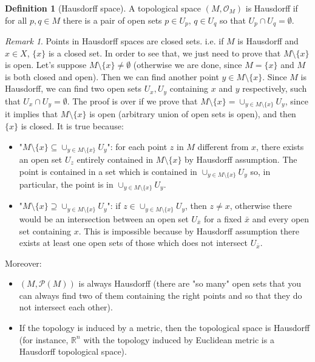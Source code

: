 \documentclass[a4paper,11pt,titlepage, article, oneside]{memoir}
\numberwithin{equation}{section}
\theoremstyle{definition}
\newtheorem{definition}[theorem]{Definition}
\theoremstyle{remark}
\newtheorem{remark}[theorem]{Remark}
\newcommand{\rfield}{\mathbb{R}}
\begin{document}
\begin{definition}[Hausdorff space]
A topological space $(M, \mathcal{O}_M)$ is Hausdorff if for all $p, q \in M$ there is a pair of open sets $p \in U_p, \,q \in U_q$ so that $U_p \cap U_q = \emptyset$.
\end{definition}

\begin{remarkbox}\begin{remark}
Points in Hausdorff spaces are closed sets. i.e. if $M$ is Hausdorff and $x \in X$, $\{x\}$ is a closed set. In order to see that, we just need to prove that $M \setminus \{x\}$ is open. Let's suppose $M \setminus \{x\} \not = \emptyset$ (otherwise we are done, since $M = \{x\}$ and $M$ is both closed and open). Then we can find another point $y \in M \setminus \{x\}$. Since $M$ is Hausdorff, we can find two open sets $U_x, U_y$ containing $x$ and $y$ respectively, such that $U_x \cap U_y = \emptyset$. The proof is over if we prove that $M \setminus \{x\} = \cup_{y \in M \setminus \{x\}} U_y$, since it implies that $M \setminus \{x\}$ is open (arbitrary union of open sets is open), and then $\{x\}$ is closed. It is true because:
\begin{itemize}
\item "$M \setminus \{x\} \subseteq  \cup_{y \in M \setminus \{x\}} U_y$": for each point $z$ in $M$ different from $x$, there exists an open set $U_z$ entirely contained in $M \setminus \{x\}$ by Hausdorff assumption. The point is contained in a set which is contained in $\cup_{y \in M \setminus \{x\}} U_y$ so, in particular, the point is in $\cup_{y \in M \setminus \{x\}} U_y$.
\item "$M \setminus \{x\} \supseteq \cup_{y \in M \setminus \{x\}} U_y$": if $z \in \cup_{y \in M \setminus \{x\}} U_y$, then $z \not = x$, otherwise there would be an intersection between an open set $U_{\bar x}$ for a fixed $\bar x$ and every open set containing $x$. This is impossible because by Hausdorff assumption there exists at least one open sets of those which does not intersect $U_{\bar x}$.
\end{itemize}

Moreover:
\begin{itemize}
	\item $(M, \mathcal{P}(M))$ is always Hausdorff (there are "so many" open sets that you can always find two of them containing the right points and so that they do not intersect each other).
	\item If the topology is induced by a metric, then the topological space is Hausdorff (for instance, $\rfield^n$ with the topology induced by Euclidean metric is a Hausdorff topological space).
\end{itemize}
\end{remark}\end{remarkbox}
\end{document}
